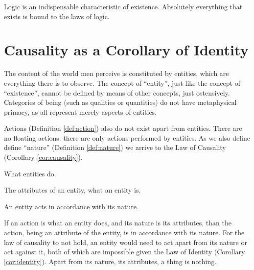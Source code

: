         Logic is an indispensable characteristic of existence. Absolutely everything that exists is bound to the laws of logic.
            
    \section{Causality as a Corollary of Identity}
        
        The content of the world men perceive is constituted by entities, which are everything there is to observe. The concept of ``entity'', just like the concept of ``existence'', cannot be defined by means of other concepts, just ostensively. Categories of being (such as qualities or quantities) do not have metaphysical primacy, as all represent merely aspects of entities.

        Actions (Definition \ref{def:action}) also do not exist apart from entities. There are no floating actions: there are only actions performed by entities. As we also define define ``nature'' (Definition \ref{def:nature}) we arrive to the Law of Causality (Corollary \ref{cor:causality}).
        
            \begin{definition}[Action]
            \label{def:action}
                What entities do.
            \end{definition}
            
            \begin{definition}[Nature]
            \label{def:nature}
                The attributes of an entity, what an entity is.
            \end{definition}
        
            \begin{corollary}
            \label{cor:causality}
                An entity acts in accordance with its nature.
            \end{corollary}

            \begin{remark}
                If an action is what an entity does, and its nature is its attributes, than the action, being an attribute of the entity, is in accordance with its nature. For the law of causality to not hold, an entity would need to act apart from its nature or act against it, both of which are impossible given the Law of Identity (Corollary \ref{cor:identity}). Apart from its nature, its attributes, a thing is nothing.
            \end{remark}
            

